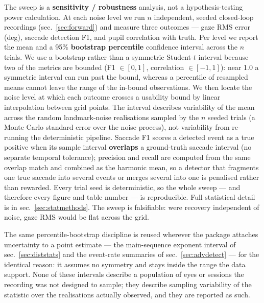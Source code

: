 \documentclass[
]{article}
\begin{document}
The sweep is a \textbf{sensitivity / robustness} analysis, not a
hypothesis-testing power calculation. At each noise level we run \(n\)
independent, seeded closed-loop recordings (sec.~\ref{sec:forward}) and
measure three outcomes --- gaze RMS error (deg), saccade detection F1,
and pupil correlation with truth. Per level we report the mean and a
95\% \textbf{bootstrap percentile} confidence interval across the \(n\)
trials. We use a bootstrap rather than a symmetric Student-\(t\)
interval because two of the metrics are bounded (F1 \(\in[0,1]\),
correlation \(\in[-1,1]\)): near 1.0 a symmetric interval can run past
the bound, whereas a percentile of resampled means cannot leave the
range of the in-bound observations. We then locate the noise level at
which each outcome crosses a usability bound by linear interpolation
between grid points. The interval describes variability of the mean
across the random landmark-noise realisations sampled by the \(n\)
seeded trials (a Monte Carlo standard error over the noise process), not
variability from re-running the deterministic pipeline. Saccade F1
scores a detected event as a true positive when its sample interval
\textbf{overlaps} a ground-truth saccade interval (no separate temporal
tolerance); precision and recall are computed from the same overlap
match and combined as the harmonic mean, so a detector that fragments
one true saccade into several events or merges several into one is
penalised rather than rewarded. Every trial seed is deterministic, so
the whole sweep --- and therefore every figure and table number --- is
reproducible. Full statistical detail is in sec.~\ref{sec:statmethods}.
The sweep is falsifiable: were recovery independent of noise, gaze RMS
would be flat across the grid.

The same percentile-bootstrap discipline is reused wherever the package
attaches uncertainty to a point estimate --- the main-sequence exponent
interval of sec.~\ref{sec:diststats} and the event-rate summaries of
sec.~\ref{sec:advdetect} --- for the identical reason: it assumes no
symmetry and stays inside the range the data support. None of these
intervals describe a population of eyes or sessions the recording was
not designed to sample; they describe sampling variability of the
statistic over the realisations actually observed, and they are reported
as such.
\end{document}
